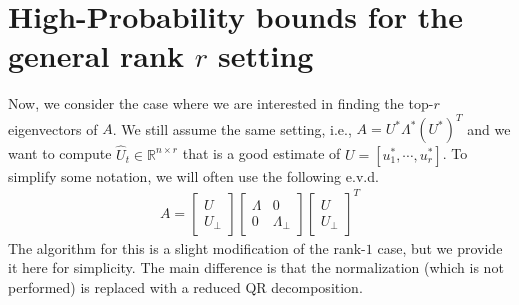 \documentclass[10pt]{article}
\newcommand{\R}{\mathbb{R}}
\newcommand{\nsrmax}{\text{NSR}}
\newcommand{\ind}{\mathrm{ind}}
\begin{document}


\section{High-Probability bounds for the general rank $r$ setting}
Now, we consider the case where we are interested in finding the top-$r$ eigenvectors of $A$. We still assume the same setting, i.e., $A = U^* \Lambda^* (U^*)^T$ and we want to compute $\hat{U}_t \in \R^{n \times r}$ that is a good estimate of $U = [u_1^*, \cdots, u_r^*]$. To simplify some notation, we will often use the following e.v.d. 
\begin{align*}
A = 
\begin{bmatrix}
U \\ U_{\perp}
\end{bmatrix}
\begin{bmatrix}
\Lambda & 0  \\
0 & \Lambda_{\perp}
\end{bmatrix}
\begin{bmatrix}
U \\ U_{\perp}
\end{bmatrix}^T
\end{align*}
 The algorithm for this is a slight modification of the rank-$1$ case, but we provide it here for simplicity. The main difference is that the normalization (which is not performed) is replaced with a reduced QR decomposition. 
\end{document}

